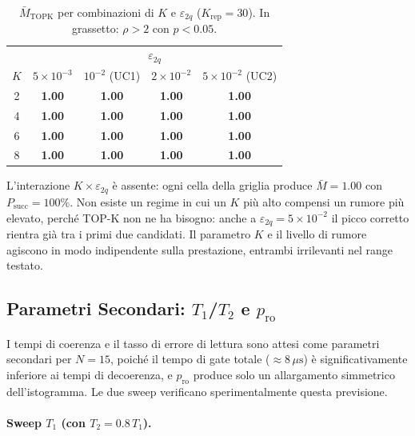 \begin{onehalfspace}
\begin{table}[H]
\centering
\caption{$\bar{M}_{\text{TOPK}}$ per combinazioni di $K$ e $\varepsilon_{2q}$ ($K_{\text{rep}}=30$). In grassetto: $\rho > 2$ con $p < 0.05$.}
\label{tab:sweep_joint}
\begin{tabular}{c|cccc}
\hline
 & \multicolumn{4}{c}{$\varepsilon_{2q}$} \\
$K$ & $5\times10^{-3}$ & $10^{-2}$ (UC1) & $2\times10^{-2}$ & $5\times10^{-2}$ (UC2) \\
\hline
2 & \textbf{1.00} & \textbf{1.00} & \textbf{1.00} & \textbf{1.00} \\
4 & \textbf{1.00} & \textbf{1.00} & \textbf{1.00} & \textbf{1.00} \\
6 & \textbf{1.00} & \textbf{1.00} & \textbf{1.00} & \textbf{1.00} \\
8 & \textbf{1.00} & \textbf{1.00} & \textbf{1.00} & \textbf{1.00} \\
\hline
\end{tabular}
\end{table}

L'interazione $K \times \varepsilon_{2q}$ è assente: ogni cella della griglia produce $\bar{M}=1.00$ con $P_{\text{succ}}=100\%$. Non esiste un regime in cui un $K$ più alto compensi un rumore più elevato, perché TOP-K non ne ha bisogno: anche a $\varepsilon_{2q}=5\times10^{-2}$ il picco corretto rientra già tra i primi due candidati. Il parametro $K$ e il livello di rumore agiscono in modo indipendente sulla prestazione, entrambi irrilevanti nel range testato.

\subsection{Parametri Secondari: $T_1$/$T_2$ e $p_{\text{ro}}$}
\label{subsec:sweep_secondari}

I tempi di coerenza e il tasso di errore di lettura sono attesi come parametri secondari per $N=15$, poiché il tempo di gate totale (${\approx}8\,\mu\text{s}$) è significativamente inferiore ai tempi di decoerenza, e $p_{\text{ro}}$ produce solo un allargamento simmetrico dell'istogramma. Le due sweep verificano sperimentalmente questa previsione.

\paragraph{Sweep $T_1$ (con $T_2 = 0.8\,T_1$).}


\end{onehalfspace}
